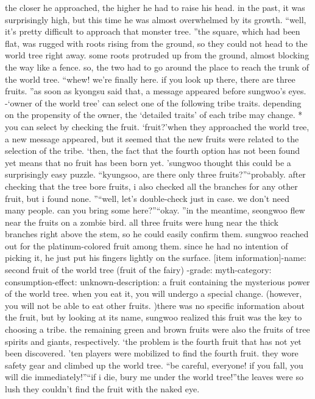 the closer he approached, the higher he had to raise his head.
 in the past, it was surprisingly high, but this time he was almost overwhelmed by its growth.
“well, it’s pretty difficult to approach that monster tree.
”the square, which had been flat, was rugged with roots rising from the ground, so they could not head to the world tree right away.
some roots protruded up from the ground, almost blocking the way like a fence.
so, the two had to go around the place to reach the trunk of the world tree.
“whew! we’re finally here.
 if you look up there, there are three fruits.
”as soon as kyongsu said that, a message appeared before sungwoo’s eyes.
-‘owner of the world tree’ can select one of the following tribe traits.
 depending on the propensity of the owner, the ‘detailed traits’ of each tribe may change.
* you can select by checking the fruit.
‘fruit?’when they approached the world tree, a new message appeared, but it seemed that the new fruits were related to the selection of the tribe.
‘then, the fact that the fourth option has not been found yet means that no fruit has been born yet.
’sungwoo thought this could be a surprisingly easy puzzle.
“kyungsoo, are there only three fruits?”“probably.
 after checking that the tree bore fruits, i also checked all the branches for any other fruit, but i found none.
”“well, let’s double-check just in case.
 we don’t need many people.
 can you bring some here?”“okay.
”in the meantime, seongwoo flew near the fruits on a zombie bird.
 all three fruits were hung near the thick branches right above the stem, so he could easily confirm them.
sungwoo reached out for the platinum-colored fruit among them.
 since he had no intention of picking it, he just put his fingers lightly on the surface.
[item information]-name: second fruit of the world tree (fruit of the fairy)
-grade: myth-category: consumption-effect: unknown-description: a fruit containing the mysterious power of the world tree.
 when you eat it, you will undergo a special change.
 (however, you will not be able to eat other fruits.
)there was no specific information about the fruit, but by looking at its name, sungwoo realized this fruit was the key to choosing a tribe.
the remaining green and brown fruits were also the fruits of tree spirits and giants, respectively.
‘the problem is the fourth fruit that has not yet been discovered.
’ten players were mobilized to find the fourth fruit.
 they wore safety gear and climbed up the world tree.
“be careful, everyone! if you fall, you will die immediately!”“if i die, bury me under the world tree!”the leaves were so lush they couldn’t find the fruit with the naked eye.
